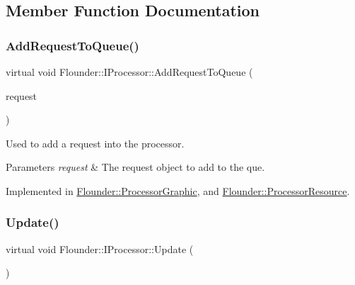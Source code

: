 \subsection{Member Function Documentation}
\mbox{\label{class_flounder_1_1_i_processor_a147a68665ac362d33f5de7740279d224}} 
\subsubsection{\texorpdfstring{Add\+Request\+To\+Queue()}{AddRequestToQueue()}}
{\footnotesize\ttfamily virtual void Flounder\+::\+I\+Processor\+::\+Add\+Request\+To\+Queue (\begin{DoxyParamCaption}\item[{\hyperlink{class_flounder_1_1_i_request}{I\+Request} $\ast$}]{request }\end{DoxyParamCaption})\hspace{0.3cm}{\ttfamily [pure virtual]}}



Used to add a request into the processor. 


\begin{DoxyParams}{Parameters}
{\em request} & The request object to add to the que. \\
\hline
\end{DoxyParams}


Implemented in \hyperlink{class_flounder_1_1_processor_graphic_a238770973388faedded17e5da1347f2b}{Flounder\+::\+Processor\+Graphic}, and \hyperlink{class_flounder_1_1_processor_resource_afcf217b354213aba94e6288583e88d49}{Flounder\+::\+Processor\+Resource}.

\mbox{\label{class_flounder_1_1_i_processor_ade1b8614d9e1b62ad66887426701a5d4}} 
\subsubsection{\texorpdfstring{Update()}{Update()}}
{\footnotesize\ttfamily virtual void Flounder\+::\+I\+Processor\+::\+Update (\begin{DoxyParamCaption}{ }\end{DoxyParamCaption})\hspace{0.3cm}{\ttfamily [pure virtual]}}



